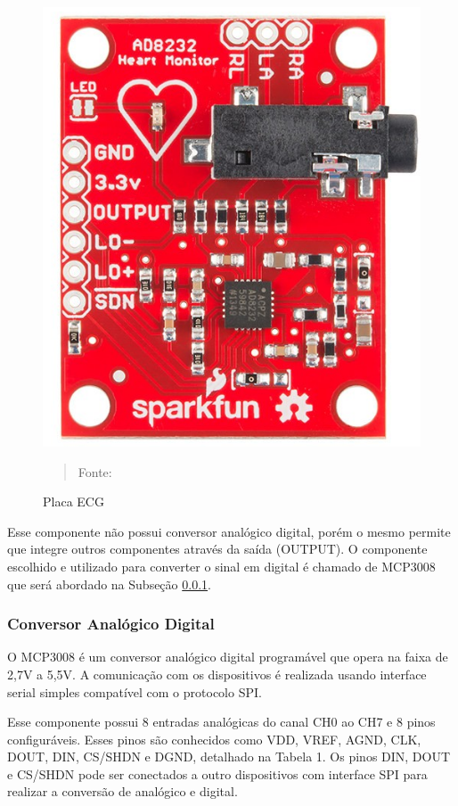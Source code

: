 \documentclass[12pt, a4paper]{article}
\begin{document}
\begin{figure}[H]
\begin{center}
			\caption{Placa ECG}
			\includegraphics[width=.5\textwidth]{Figuras/pc.PNG}
            \vspace*{\fill} 
            \begin{quote} 
            \centering 
           Fonte: \cite{analogic}
            \end{quote}
            \vspace*{\fill}
			\label{fig:circ}
\end{center}
\end{figure}
Esse componente não possui conversor analógico digital, porém o mesmo permite que integre outros componentes através da saída (OUTPUT). O componente escolhido e utilizado para converter o sinal em digital é chamado de MCP3008 que será abordado na Subseção \ref{sec:conversorAD}.

\subsubsection{Conversor Analógico Digital}\label{sec:conversorAD}

\hspace*{0.8cm}O MCP3008 é um conversor analógico digital programável que opera na faixa de 2,7V a 5,5V. A comunicação com os dispositivos é realizada usando
interface serial simples compatível com o protocolo SPI.

Esse componente possui 8 entradas analógicas do canal CH0 ao CH7 e 8 pinos configuráveis. Esses pinos são conhecidos como VDD, VREF, AGND, CLK, DOUT, DIN, CS/SHDN e DGND, detalhado na Tabela 1. Os pinos DIN, DOUT e CS/SHDN pode ser conectados a outro dispositivos com interface SPI para realizar a conversão de analógico e digital. 
\end{document}
